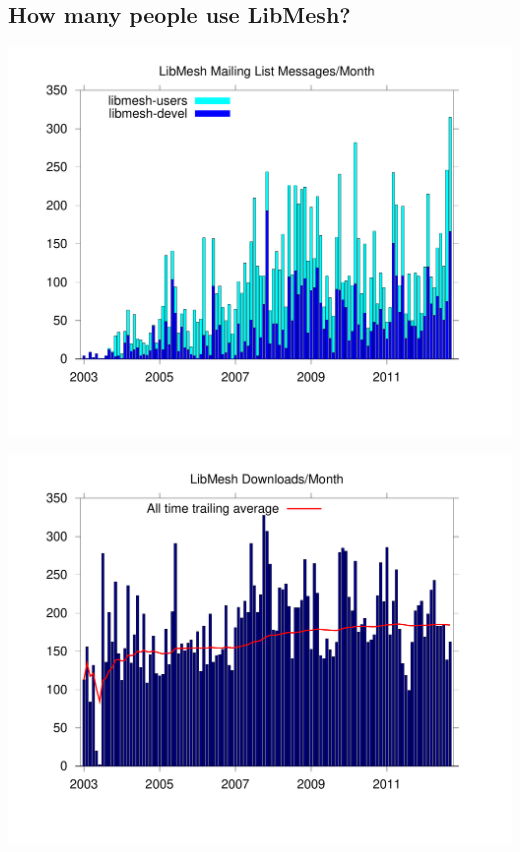 \subsection*{How many people use LibMesh?}
\begin{frame}[t]
\begin{center}
    \includegraphics[viewport=55 50 760 560,
    clip=true,width=.95\textwidth]{figures/libmesh_mailinglists}
\end{center}
\end{frame}

\begin{frame}[t]
\begin{center}
    \includegraphics[viewport=55 50 760 560,
    clip=true,width=.95\textwidth]{figures/libmesh_downloads}
\end{center}
\end{frame}

